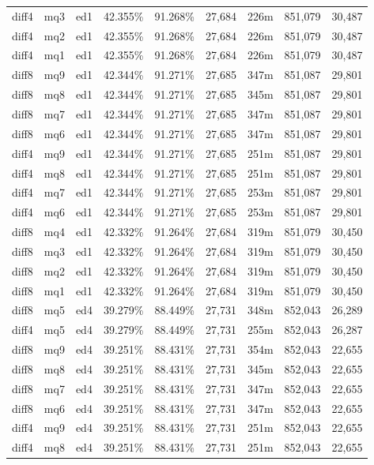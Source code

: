 \begin{landscape}
\begin{longtable}{|c|c|c||c|c||c|c|c|c|}
diff4 & mq3 & ed1 & 42.355\% & 91.268\% & 27,684 & 226m & 851,079 & 30,487 \\
diff4 & mq2 & ed1 & 42.355\% & 91.268\% & 27,684 & 226m & 851,079 & 30,487 \\
diff4 & mq1 & ed1 & 42.355\% & 91.268\% & 27,684 & 226m & 851,079 & 30,487 \\
diff8 & mq9 & ed1 & 42.344\% & 91.271\% & 27,685 & 347m & 851,087 & 29,801 \\
diff8 & mq8 & ed1 & 42.344\% & 91.271\% & 27,685 & 345m & 851,087 & 29,801 \\
diff8 & mq7 & ed1 & 42.344\% & 91.271\% & 27,685 & 347m & 851,087 & 29,801 \\
diff8 & mq6 & ed1 & 42.344\% & 91.271\% & 27,685 & 347m & 851,087 & 29,801 \\
diff4 & mq9 & ed1 & 42.344\% & 91.271\% & 27,685 & 251m & 851,087 & 29,801 \\
diff4 & mq8 & ed1 & 42.344\% & 91.271\% & 27,685 & 251m & 851,087 & 29,801 \\
diff4 & mq7 & ed1 & 42.344\% & 91.271\% & 27,685 & 253m & 851,087 & 29,801 \\
diff4 & mq6 & ed1 & 42.344\% & 91.271\% & 27,685 & 253m & 851,087 & 29,801 \\
diff8 & mq4 & ed1 & 42.332\% & 91.264\% & 27,684 & 319m & 851,079 & 30,450 \\
diff8 & mq3 & ed1 & 42.332\% & 91.264\% & 27,684 & 319m & 851,079 & 30,450 \\
diff8 & mq2 & ed1 & 42.332\% & 91.264\% & 27,684 & 319m & 851,079 & 30,450 \\
diff8 & mq1 & ed1 & 42.332\% & 91.264\% & 27,684 & 319m & 851,079 & 30,450 \\
diff8 & mq5 & ed4 & 39.279\% & 88.449\% & 27,731 & 348m & 852,043 & 26,289 \\
diff4 & mq5 & ed4 & 39.279\% & 88.449\% & 27,731 & 255m & 852,043 & 26,287 \\
diff8 & mq9 & ed4 & 39.251\% & 88.431\% & 27,731 & 354m & 852,043 & 22,655 \\
diff8 & mq8 & ed4 & 39.251\% & 88.431\% & 27,731 & 345m & 852,043 & 22,655 \\
diff8 & mq7 & ed4 & 39.251\% & 88.431\% & 27,731 & 347m & 852,043 & 22,655 \\
diff8 & mq6 & ed4 & 39.251\% & 88.431\% & 27,731 & 347m & 852,043 & 22,655 \\
diff4 & mq9 & ed4 & 39.251\% & 88.431\% & 27,731 & 251m & 852,043 & 22,655 \\
diff4 & mq8 & ed4 & 39.251\% & 88.431\% & 27,731 & 251m & 852,043 & 22,655 \\

\end{longtable}
\end{landscape}
